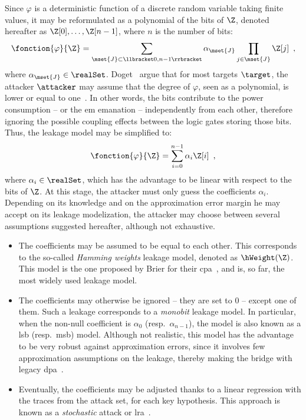 Since \(\varphi\) is a deterministic function of a discrete random variable taking finite values, it may be reformulated as a polynomial of the bits of \(\Z\), denoted hereafter as \(\Z[0],\ldots,\Z[n-1]\), where \(n\) is the number of bits:
\begin{equation}
    \fonction{\varphi}{\Z} = \sum_{\mset{J} \subset \llbracket 0, n-1 \rrbracket} \alpha_{\mset{J}} \prod_{j \in \mset{J}} \Z[j] \enspace ,
\end{equation}
where \(\alpha_{\mset{J}} \in \realSet\).
Doget \etal{}\ argue that for most targets \(\target\), the attacker \(\attacker\) may assume that the degree of \(\varphi\), seen as a polynomial, is lower or equal to one~\cite{doget_univariate_2011}.
In other words, the bits contribute to the power consumption -- or the \gls{em} emanation  -- independently from each other, therefore ignoring the possible coupling effects between the logic gates storing those bits.
Thus, the leakage model may be simplified to:
\begin{equation}
    \fonction{\varphi}{\Z} = \sum_{i=0}^{n-1} \alpha_i \Z[i] \enspace ,
\end{equation}
where \(\alpha_i \in \realSet\), which has the advantage to be linear with respect to the bits of \(\Z\).
At this stage, the attacker must only guess the coefficients \(\alpha_i\).
Depending on its knowledge and on the approximation error margin he may accept on its leakage modelization, the attacker may choose between several assumptions suggested hereafter, although not exhaustive.
\begin{itemize}
    \item The coefficients may be assumed to be equal to each other.
    This corresponds to the so-called \emph{Hamming weights} leakage model, denoted as \(\hWeight(\Z)\).
    This model is the one proposed by Brier \etal{} for their \gls{cpa}~\cite{brier_correlation_2004}, and is, so far, the most widely used leakage model.
    \item The coefficients may otherwise be ignored -- \ie{} they are set to 0 -- except one of them.
    Such a leakage corresponds to a \emph{monobit} leakage model.
    In particular, when the non-null coefficient is \(\alpha_0\) (resp.~\(\alpha_{n-1}\)), the model is also known as a \gls{lsb} (resp.~\gls{msb}) model.
    Although not realistic, this model has the advantage to be very robust against approximation errors, since it involves few approximation assumptions on the leakage, thereby making the bridge with legacy \gls{dpa}~\cite{kocher_dpa_1999}.
    \item Eventually, the coefficients may be adjusted thanks to a linear regression with the traces from the attack set, for each key hypothesis.
    This approach is known as a \emph{stochastic} attack or \gls{lra}~\cite{schindler_stochastic_2005}.
\end{itemize}

